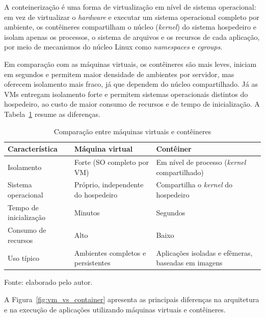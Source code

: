 \par A conteinerização é uma forma de virtualização em nível de sistema operacional: em vez de virtualizar o \textit{hardware} e executar um sistema operacional completo por ambiente, os contêineres compartilham o núcleo (\textit{kernel}) do sistema hospedeiro e isolam apenas os processos, o sistema de arquivos e os recursos de cada aplicação, por meio de mecanismos do núcleo Linux como \textit{namespaces} e \textit{cgroups}.\\
\par Em comparação com as máquinas virtuais, os contêineres são mais leves, iniciam em segundos e permitem maior densidade de ambientes por servidor, mas oferecem isolamento mais fraco, já que dependem do núcleo compartilhado. Já as VMs entregam isolamento forte e permitem sistemas operacionais distintos do hospedeiro, ao custo de maior consumo de recursos e de tempo de inicialização. A Tabela~\ref{tab:vm_vs_container} resume as diferenças.

\begin{table}[htb]
    \centering
    \caption{Comparação entre máquinas virtuais e contêineres}
    \label{tab:vm_vs_container}
    \begin{tabularx}{\textwidth}{|l|X|X|}
        \hline
        \textbf{Característica} & \textbf{Máquina virtual} & \textbf{Contêiner} \\ \hline
        Isolamento & Forte (SO completo por VM) & Em nível de processo (\textit{kernel} compartilhado) \\ \hline
        Sistema operacional & Próprio, independente do hospedeiro & Compartilha o \textit{kernel} do hospedeiro \\ \hline
        Tempo de inicialização & Minutos & Segundos \\ \hline
        Consumo de recursos & Alto & Baixo \\ \hline
        Uso típico & Ambientes completos e persistentes & Aplicações isoladas e efêmeras, baseadas em imagens \\ \hline
    \end{tabularx}
    \par\small Fonte: elaborado pelo autor.
\end{table}

\par A Figura~\ref{fig:vm_vs_container} apresenta as principais diferenças na arquitetura e na execução de aplicações utilizando máquinas virtuais e contêineres.



